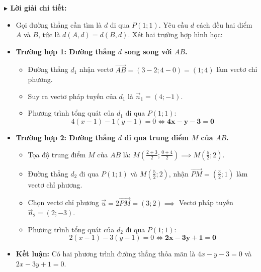 \documentclass[12pt, a4paper, landscape]{article}
\newlength{\boxheight}
\begin{document}
\begin{minipage}[t]{0.53\textwidth}
\begin{tcolorbox}[solution_box={BÓC TÁCH LỜI GIẢI}, height=\boxheight]
\small
\textbf{\textsf{$\blacktriangleright$ Lời giải chi tiết:}}
\begin{itemize}[leftmargin=*, itemsep=4pt, parsep=0pt, topsep=2pt]
    \item Gọi đường thẳng cần tìm là $d$ đi qua $P(1;1)$. Yêu cầu $d$ cách đều hai điểm $A$ và $B$, tức là $d(A, d) = d(B, d)$. Xét hai trường hợp hình học:
    
    \item \textbf{Trường hợp 1: Đường thẳng $d$ song song với $AB$.}
    \begin{itemize}
        \item Đường thẳng $d_1$ nhận vectơ $\vec{AB} = (3 - 2; 4 - 0) = (1; 4)$ làm vectơ chỉ phương.
        \item Suy ra vectơ pháp tuyến của $d_1$ là $\vec{n}_1 = (4; -1)$.
        \item Phương trình tổng quát của $d_1$ đi qua $P(1;1)$:
        $$ 4(x - 1) - 1(y - 1) = 0 \iff \mathbf{4x - y - 3 = 0} $$
    \end{itemize}
    
    \item \textbf{Trường hợp 2: Đường thẳng $d$ đi qua trung điểm $M$ của $AB$.}
    \begin{itemize}
        \item Tọa độ trung điểm $M$ của $AB$ là: $M\left(\frac{2+3}{2}; \frac{0+4}{2}\right) \implies M\left(\frac{5}{2}; 2\right)$.
        \item Đường thẳng $d_2$ đi qua $P(1;1)$ và $M\left(\frac{5}{2}; 2\right)$, nhận $\vec{PM} = \left(\frac{3}{2}; 1\right)$ làm vectơ chỉ phương.
        \item Chọn vectơ chỉ phương $\vec{u} = 2\vec{PM} = (3; 2) \implies$ Vectơ pháp tuyến $\vec{n}_2 = (2; -3)$.
        \item Phương trình tổng quát của $d_2$ đi qua $P(1;1)$:
        $$ 2(x - 1) - 3(y - 1) = 0 \iff \mathbf{2x - 3y + 1 = 0} $$
    \end{itemize}
    \item \textbf{Kết luận:} Có hai phương trình đường thẳng thỏa mãn là $4x - y - 3 = 0$ và $2x - 3y + 1 = 0$.
\end{itemize}
\end{tcolorbox}
\end{minipage}

\newpage
\end{document}
